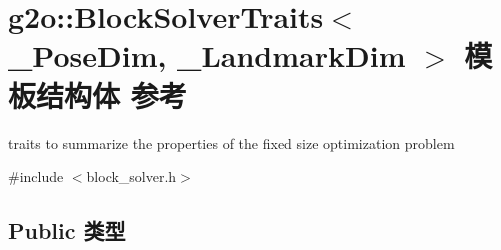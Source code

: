 \hypertarget{structg2o_1_1BlockSolverTraits}{\section{g2o\-:\-:Block\-Solver\-Traits$<$ \-\_\-\-Pose\-Dim, \-\_\-\-Landmark\-Dim $>$ 模板结构体 参考}
\label{structg2o_1_1BlockSolverTraits}
}


traits to summarize the properties of the fixed size optimization problem  




{\ttfamily \#include $<$block\-\_\-solver.\-h$>$}

\subsection*{Public 类型}
